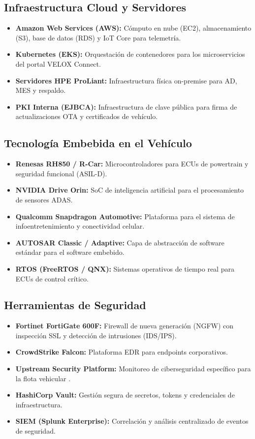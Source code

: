 \documentclass[letterpaper,11pt]{article}
\begin{document}
\subsection{Infraestructura Cloud y Servidores}
\begin{itemize}[leftmargin=1.5cm]
    \item \textbf{Amazon Web Services (AWS):} Cómputo en nube (EC2), almacenamiento (S3), base de datos (RDS) y IoT Core para telemetría.
    \item \textbf{Kubernetes (EKS):} Orquestación de contenedores para los microservicios del portal VELOX Connect.
    \item \textbf{Servidores HPE ProLiant:} Infraestructura física on-premise para AD, MES y respaldo.
    \item \textbf{PKI Interna (EJBCA):} Infraestructura de clave pública para firma de actualizaciones OTA y certificados de vehículo.
\end{itemize}

\subsection{Tecnología Embebida en el Vehículo}
\begin{itemize}[leftmargin=1.5cm]
    \item \textbf{Renesas RH850 / R-Car:} Microcontroladores para ECUs de powertrain y seguridad funcional (ASIL-D).
    \item \textbf{NVIDIA Drive Orin:} SoC de inteligencia artificial para el procesamiento de sensores ADAS.
    \item \textbf{Qualcomm Snapdragon Automotive:} Plataforma para el sistema de infoentretenimiento y conectividad celular.
    \item \textbf{AUTOSAR Classic / Adaptive:} Capa de abstracción de software estándar para el software embebido.
    \item \textbf{RTOS (FreeRTOS / QNX):} Sistemas operativos de tiempo real para ECUs de control crítico.
\end{itemize}

\subsection{Herramientas de Seguridad}
\begin{itemize}[leftmargin=1.5cm]
    \item \textbf{Fortinet FortiGate 600F:} Firewall de nueva generación (NGFW) con inspección SSL y detección de intrusiones (IDS/IPS).
    \item \textbf{CrowdStrike Falcon:} Plataforma EDR para endpoints corporativos.
    \item \textbf{Upstream Security Platform:} Monitoreo de ciberseguridad específico para la flota vehicular \autocite{upstream-security-report}.
    \item \textbf{HashiCorp Vault:} Gestión segura de secretos, tokens y credenciales de infraestructura.
    \item \textbf{SIEM (Splunk Enterprise):} Correlación y análisis centralizado de eventos de seguridad.
\end{itemize}
\end{document}
